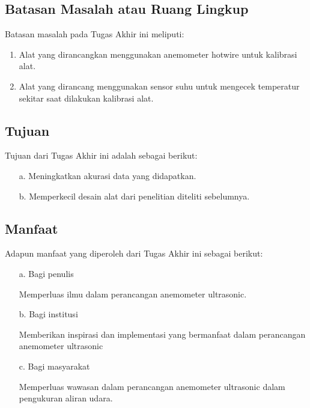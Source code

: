 \subsection{Batasan Masalah atau Ruang Lingkup}

Batasan masalah pada Tugas Akhir ini meliputi:
\begin{enumerate}
	\item Alat yang dirancangkan menggunakan anemometer hotwire untuk kalibrasi alat.
	\item Alat yang dirancang menggunakan sensor suhu untuk mengecek temperatur sekitar saat dilakukan kalibrasi alat.
\end{enumerate}

\subsection{Tujuan}

Tujuan dari Tugas Akhir ini adalah sebagai berikut:
\begin{enumerate}
	\item[a.]	Meningkatkan akurasi data yang didapatkan.
	\item[b.]	Memperkecil desain alat dari penelitian diteliti sebelumnya.
\end{enumerate}

\subsection{Manfaat}

Adapun manfaat yang diperoleh dari Tugas Akhir ini sebagai berikut:
\begin{enumerate}
	\item [a.]	Bagi penulis 
	
	Memperluas ilmu dalam perancangan anemometer ultrasonic.
	
	\item [b.]	Bagi institusi
	
	 Memberikan inspirasi dan implementasi yang bermanfaat dalam perancangan anemometer ultrasonic
	
	\item [c.]	Bagi masyarakat
	
	Memperluas wawasan dalam perancangan anemometer ultrasonic dalam pengukuran aliran udara.
	
\end{enumerate}
